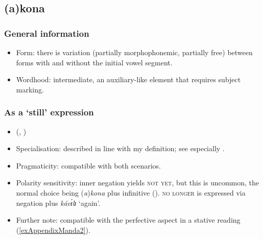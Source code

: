 \subsection{(a)kona}
\subsubsection{General information}
\begin{itemize}
	\item Form: there is variation (partially morphophonemic, partially free) between forms with and without the initial vowel segment.
	\item Wordhood: intermediate, an auxiliary-like element that requires subject marking.
\end{itemize}
	

\subsubsection{As a  \lq still\rq{ }expression}
\begin{itemize}
	\item \citeauthor{Bernander2017} (\citeyear[259–265]{Bernander2017}, \citeyear{Bernander2021})
	\item Specialisation: described in line with my definition; see especially \textcite[51]{Bernander2021}.
	\item Pragmaticity: compatible with both scenarios.
	\item Polarity sensitivity: inner negation yields \textsc{not yet}, but this is uncommon, the normal choice being \mbox{(\textit{a})\textit{kona}} plus infinitive (). \textsc{no longer} is expressed via negation plus \textit{kávɪ́lɪ} \lq again'. 
	\item Further note: compatible with the perfective aspect in a stative reading (\ref{exAppendixManda2}).
\end{itemize}

